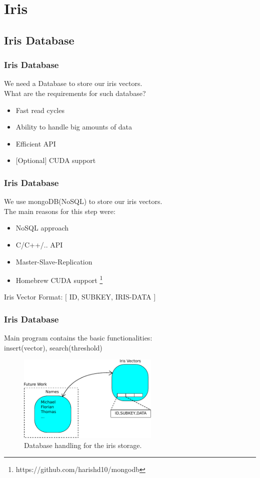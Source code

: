 \documentclass{beamer}
\begin{document}
\section{Iris} 
\subsection{Iris Database}
\begin{frame}
\frametitle{Iris Database} 
We need a Database to store our iris vectors.\\
What are the requirements for such database?\\
  \begin{itemize}
    \item Fast read cycles
    \item Ability to handle big amounts of data
    \item Efficient API
    \item $[$Optional$]$ CUDA support
  \end{itemize}
\end{frame}

\begin{frame}
\frametitle{Iris Database} 
We use mongoDB(NoSQL) to store our iris vectors.\\
The main reasons for this step were:\\
  \begin{itemize}
    \item NoSQL approach
    \item C/C++/.. API
    \item Master-Slave-Replication
    \item Homebrew CUDA support \footnote{https://github.com/harishd10/mongodb}
  \end{itemize}
  Iris Vector Format: $[$ ID, SUBKEY, IRIS-DATA $]$
\end{frame}


\begin{frame}
\frametitle{Iris Database} 
Main program contains the basic functionalities: \\insert(vector), search(threshold)
    \begin{figure}[hp]
       \includegraphics[width=0.60\textwidth]{../report/iris/Database_Approach.pdf}
       \caption{Database handling for the iris storage.}
     \label{fig:flow}
   \end{figure} 
\end{frame}
\end{document}

